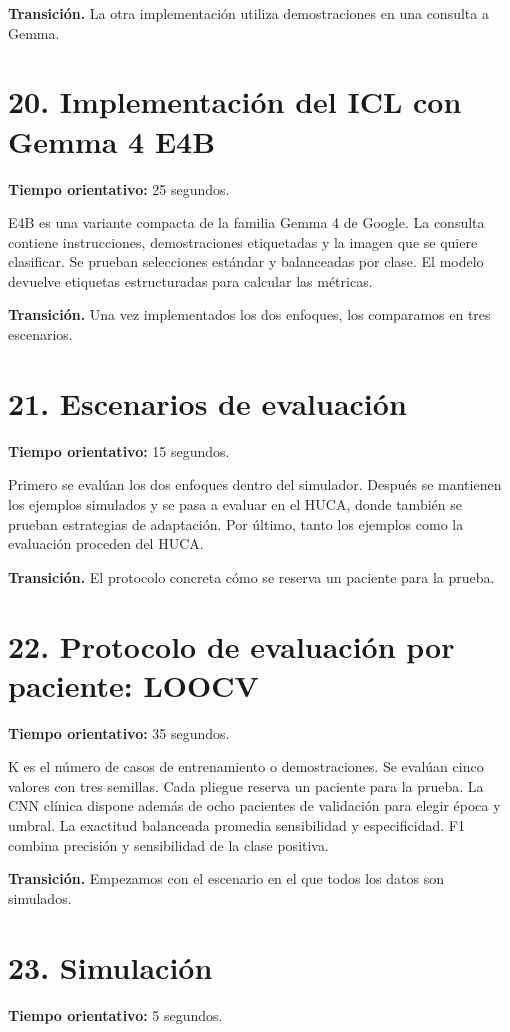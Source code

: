 \documentclass[11pt,a4paper]{article}
\begin{document}
\textbf{Transición.} La otra implementación utiliza demostraciones en una consulta a Gemma.

\section*{20. Implementación del ICL con Gemma 4 E4B}
\textbf{Tiempo orientativo: }25 segundos.

E4B es una variante compacta de la familia Gemma 4 de Google. La consulta contiene instrucciones, demostraciones etiquetadas y la imagen que se quiere clasificar. Se prueban selecciones estándar y balanceadas por clase. El modelo devuelve etiquetas estructuradas para calcular las métricas.

\textbf{Transición.} Una vez implementados los dos enfoques, los comparamos en tres escenarios.

\section*{21. Escenarios de evaluación}
\textbf{Tiempo orientativo: }15 segundos.

Primero se evalúan los dos enfoques dentro del simulador. Después se mantienen los ejemplos simulados y se pasa a evaluar en el HUCA, donde también se prueban estrategias de adaptación. Por último, tanto los ejemplos como la evaluación proceden del HUCA.

\textbf{Transición.} El protocolo concreta cómo se reserva un paciente para la prueba.

\section*{22. Protocolo de evaluación por paciente: LOOCV}
\textbf{Tiempo orientativo: }35 segundos.

K es el número de casos de entrenamiento o demostraciones. Se evalúan cinco valores con tres semillas. Cada pliegue reserva un paciente para la prueba. La CNN clínica dispone además de ocho pacientes de validación para elegir época y umbral. La exactitud balanceada promedia sensibilidad y especificidad. F1 combina precisión y sensibilidad de la clase positiva.

\textbf{Transición.} Empezamos con el escenario en el que todos los datos son simulados.

\section*{23. Simulación}
\textbf{Tiempo orientativo: }5 segundos.
\end{document}

